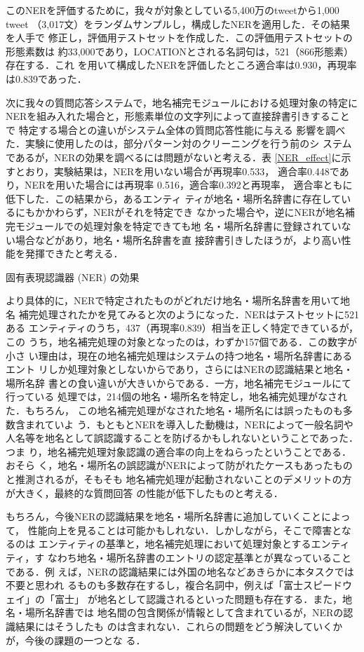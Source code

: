 \documentclass[japanese]{jnlp_1.4}
\begin{document}
このNERを評価するために，我々が対象としている5,400万のtweetから1,000 tweet
（3,017文）をランダムサンプルし，構成したNERを適用した．その結果を人手で
修正し，評価用テストセットを作成した．この評価用テストセットの形態素数は
約33,000であり，LOCATIONとされる名詞句は，521（866形態素）存在する．これ
を用いて構成したNERを評価したところ適合率は0.930，再現率は0.839であった．

次に我々の質問応答システムで，地名補完モジュールにおける処理対象の特定に
NERを組み入れた場合と，形態素単位の文字列によって直接辞書引きすることで
特定する場合との違いがシステム全体の質問応答性能に与える
影響を調べた．実験に使用したのは，部分パターン対のクリーニングを行う前のシ
ステムであるが，NERの効果を調べるには問題がないと考える．表
\ref{NER_effect}に示すとおり，実験結果は，NERを用いない場合が再現率0.533，
適合率0.448であり，NERを用いた場合には再現率 0.516，適合率0.392と再現率，
適合率ともに低下した．この結果から，あるエンティ
ティが地名・場所名辞書に存在しているにもかかわらず，NERがそれを特定でき
なかった場合や，逆にNERが地名補完モジュールでの処理対象を特定できても地
名・場所名辞書に登録されていない場合などがあり，地名・場所名辞書を直
接辞書引きしたほうが，より高い性能を発揮できたと考える．

\begin{table}[b]
\caption{固有表現認識器 (NER) の効果}
\label{NER_effect}

\end{table}

より具体的に，NERで特定されたものがどれだけ地名・場所名辞書を用いて地名
補完処理されたかを見てみると次のようになった．NERはテストセットに521ある
エンティティのうち，437（再現率0.839）相当を正しく特定できているが，この
うち，地名補完処理の対象となったのは，わずか157個である．この数字が小さ
い理由は，現在の地名補完処理はシステムの持つ地名・場所名辞書にあるエント
リしか処理対象としないからであり，さらにはNERの認識結果と地名・場所名辞
書との食い違いが大きいからである．一方，地名補完モジュールにて行っている
処理では，214個の地名・場所名を特定し，地名補完処理がなされた．もちろん，
この地名補完処理がなされた地名・場所名には誤ったものも多数含まれていよ
う．もともとNERを導入した動機は，NERによって一般名詞や人名等を地名として誤認識することを防げるかもしれないということであった．つま
り，地名補完処理対象認識の適合率の向上をねらったということである．おそら
く，地名・場所名の誤認識がNERによって防がれたケースもあったものと推測されるが，そもそも
地名補完処理が起動されないことのデメリットの方が大きく，最終的な質問回答
の性能が低下したものと考える．

もちろん，今後NERの認識結果を地名・場所名辞書に追加していくことによって，
性能向上を見ることは可能かもしれない．しかしながら，そこで障害となるのは
エンティティの基準と，地名補完処理において処理対象とするエンティティ，す
なわち地名・場所名辞書のエントリの認定基準とが異なっていることである．例
えば，NERの認識結果には外国の地名などあきらかに本タスクでは不要と思われ
るものも多数存在するし，複合名詞中，例えば「富士スピードウェイ」の「富士」
が地名として認識されるといった問題も存在する．また，地名・場所名辞書では
地名間の包含関係が情報として含まれているが，NERの認識結果にはそうしたも
のは含まれない．これらの問題をどう解決していくかが，今後の課題の一つとな
る．
\end{document}
